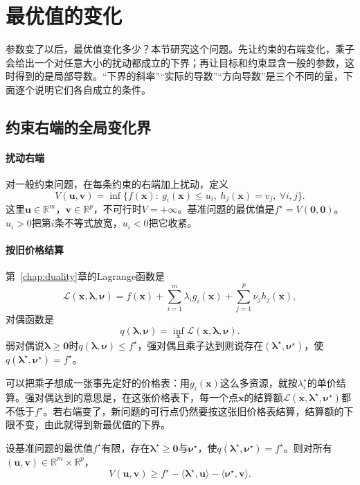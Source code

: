 \section{最优值的变化}
\label{sec:sens-value}

参数变了以后，最优值变化多少？本节研究这个问题。先让约束的右端变化，乘子会给出一个对任意大小的扰动都成立的下界；再让目标和约束显含一般的参数，这时得到的是局部导数。“下界的斜率”“实际的导数”“方向导数”是三个不同的量，下面逐个说明它们各自成立的条件。

\subsection{约束右端的全局变化界}
\label{sec:sens-rhs-bound}

\paragraph{扰动右端}
对一般约束问题，在每条约束的右端加上扰动，定义
\begin{equation}
 V(\bm{u},\bm{v})=\inf\bigl\{f(\bm{x}):\ g_i(\bm{x})\leq u_i,\ h_j(\bm{x})=v_j,\ \forall i,j\bigr\}.
 \label{eq:sens-rhs-value}
\end{equation}
这里$\bm{u}\in\mathbb{R}^m$，$\bm{v}\in\mathbb{R}^p$，不可行时$V=+\infty$。基准问题的最优值是$f^\star=V(\bm{0},\bm{0})$。$u_i>0$把第$i$条不等式放宽，$u_i<0$把它收紧。

\paragraph{按旧价格结算}
第~\ref{chap:duality}章的Lagrange函数是
\[
 \mathcal{L}(\bm{x},\bm{\lambda},\bm{\nu})=f(\bm{x})+\sum_{i=1}^m\lambda_ig_i(\bm{x})+\sum_{j=1}^p\nu_jh_j(\bm{x}),
\]
对偶函数是
\[
 q(\bm{\lambda},\bm{\nu})=\inf_{\bm{x}}\mathcal{L}(\bm{x},\bm{\lambda},\bm{\nu}).
\]
弱对偶说$\bm{\lambda}\geq\bm{0}$时$q(\bm{\lambda},\bm{\nu})\leq f^\star$，强对偶且乘子达到则说存在$(\bm{\lambda}^\star,\bm{\nu}^\star)$，使$q(\bm{\lambda}^\star,\bm{\nu}^\star)=f^\star$。

可以把乘子想成一张事先定好的价格表：用$g_i(\bm{x})$这么多资源，就按$\lambda_i^\star$的单价结算。强对偶达到的意思是，在这张价格表下，每一个点$\bm{x}$的结算额$\mathcal{L}(\bm{x},\bm{\lambda}^\star,\bm{\nu}^\star)$都不低于$f^\star$。若右端变了，新问题的可行点仍然要按这张旧价格表结算，结算额的下限不变，由此就得到新最优值的下界。

\begin{theorem}[最优值的全局下界]
\label{thm:sens-rhs-bound}
设基准问题的最优值$f^\star$有限，存在$\bm{\lambda}^\star\geq\bm{0}$与$\bm{\nu}^\star$，使$q(\bm{\lambda}^\star,\bm{\nu}^\star)=f^\star$。则对所有$(\bm{u},\bm{v})\in\mathbb{R}^m\times\mathbb{R}^p$，
\begin{equation}
 V(\bm{u},\bm{v})\geq f^\star-\langle\bm{\lambda}^\star,\bm{u}\rangle-\langle\bm{\nu}^\star,\bm{v}\rangle.
 \label{eq:sens-rhs-bound}
\end{equation}
\end{theorem}

